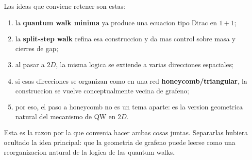 Las ideas que conviene retener son estas:

\begin{enumerate}[leftmargin=*]
  \item la \textbf{quantum walk minima} ya produce una ecuacion tipo Dirac en \(1+1\);
  \item la \textbf{split-step walk} refina esa construccion y da mas control sobre masa y cierres de gap;
  \item al pasar a \(2D\), la misma logica se extiende a varias direcciones espaciales;
  \item si esas direcciones se organizan como en una red \textbf{honeycomb/triangular}, la construccion se vuelve conceptualmente vecina de grafeno;
  \item por eso, el paso a honeycomb no es un tema aparte: es la version geometrica natural del mecanismo de QW en \(2D\).
\end{enumerate}

Esta es la razon por la que convenia hacer ambas cosas juntas. Separarlas hubiera ocultado la idea principal: que la geometria de grafeno puede leerse como una reorganizacion natural de la logica de las quantum walks.

